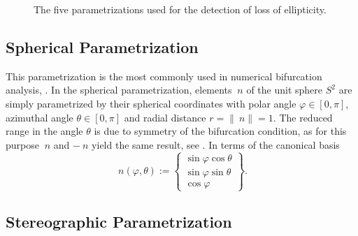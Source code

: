 \documentclass[12pt]{article}
\numberwithin{equation}{section}
\begin{document}
\begin{figure}[!htbp]
\begin{center}
{      \label{fig:tangent}
    }
    \caption{The five parametrizations used for the detection of loss
      of ellipticity.}
    \label{fig:parametrizations}
  \end{center}
\end{figure}

\subsection{Spherical Parametrization}
\label{subsec:spherical}

This parametrization is the most commonly used in numerical
bifurcation analysis, \eg \citep{Mosler:2005, Andrade.Borja:2006,
  Springmann.etal:2009, Regueiro.Foster:2011}.  In the spherical
parametrization, elements $~n$ of the unit sphere $S^2$ are simply
parametrized by their spherical coordinates with polar angle
$\varphi \in [0, \pi]$, azimuthal angle $\theta \in [0, \pi]$ and
radial distance $r = \|~n \| = 1$. The reduced range in the angle
$\theta$ is due to symmetry of the bifurcation condition, as for this
purpose $~n$ and $- ~n$ yield the same result, see
. In terms of the canonical basis
\begin{equation}
  ~n(\varphi, \theta)
  :=
  \begin{Bmatrix}
    \sin\varphi \cos\theta
    \\
    \sin\varphi \sin\theta
    \\
    \cos\varphi
  \end{Bmatrix}.
\end{equation}

\subsection{Stereographic Parametrization}
\label{subsec:stereographic}
\end{document}
